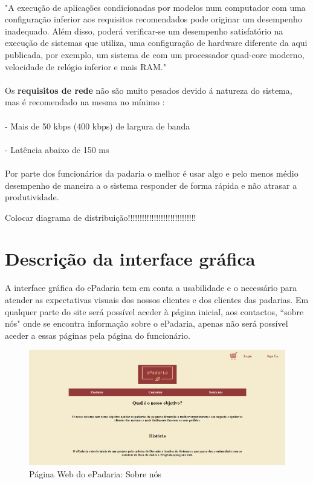 \\"A execução de aplicações condicionadas por modelos num computador com uma configuração inferior aos requisitos recomendados pode originar um desempenho inadequado. Além disso, poderá verificar-se um desempenho satisfatório na execução de sistemas que utiliza, uma configuração de hardware diferente da aqui publicada, por exemplo, um sistema de com um processador quad-core moderno, velocidade de relógio inferior e mais RAM."\\
\\Os \textbf{requisitos de rede} não são muito pesados devido á natureza do sistema, mas é recomendado na mesma no mínimo :\\
\\- Mais de 50 kbps (400 kbps) de largura de banda\\
\\- Latência abaixo de 150 ms\\
\\Por parte dos funcionários da padaria o melhor é usar algo e pelo menos médio desempenho de maneira a o sistema responder de forma rápida e não atrasar a produtividade.

Colocar diagrama de distribuição!!!!!!!!!!!!!!!!!!!!!!!!!!!!!



\section{Descrição da interface gráfica}

A interface gráfica do ePadaria tem em conta a usabilidade e o necessário para atender as expectativas visuais dos nossos clientes e dos clientes das padarias. Em qualquer parte do site será possível aceder à página inicial, aos contactos, “sobre nós" onde se encontra informação sobre o ePadaria, apenas não será possível aceder a essas páginas pela página do funcionário.
\begin{figure}[H]
	\centering
	\includegraphics[width=15cm]{"mockup sobre nos"}
	\caption{Página Web do ePadaria: Sobre nós}
	\label{fig:mockup-sobre-nos}
\end{figure}


